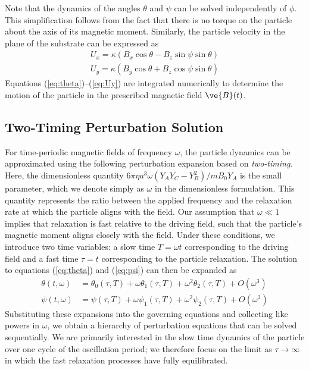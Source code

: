 Note that the dynamics of the angles $\theta$ and $\psi$ can be solved independently of $\phi$.  This simplification follows from the fact that there is no torque on the particle about the axis of its magnetic moment. Similarly, the particle velocity in the plane of the substrate can be expressed as
\begin{align}
    U_x = \kappa (B_x \cos \theta -  B_z \sin \psi \sin\theta) \label{eq:Ux}
    \\
    U_y = \kappa (B_y \cos\theta + B_z \cos\psi \sin\theta ) \label{eq:Uy}
\end{align}
Equations (\ref{eq:theta})--(\ref{eq:Uy}) are integrated numerically to determine the motion of the particle in the prescribed magnetic field $\ve{B}(t)$.

\subsection{Two-Timing Perturbation Solution}

For time-periodic magnetic fields of frequency $\omega$, the particle dynamics can be approximated using the following perturbation expansion based on \emph{two-timing}.\autocite{Strogatz2015} Here, the dimensionless quantity $6\pi \eta a^3 \omega (Y_A Y_C - Y_B^2)/m B_0 Y_A$ is the small parameter, which we denote simply as $\omega$ in the dimensionless formulation. This quantity represents the ratio between the applied frequency and the relaxation rate at which the particle aligns with the field.  Our assumption that $\omega\ll 1$ implies that relaxation is fast relative to the driving field, such that the particle's magnetic moment aligns closely with the field. Under these conditions, we introduce two time variables: a slow time $T=\omega t$ corresponding to the driving field and a fast time $\tau=t$ corresponding to the particle relaxation.  The solution to equations (\ref{eq:theta}) and (\ref{eq:psi}) can then be expanded as
\begin{align}
    \theta(t,\omega) &= \theta_0(\tau,T) + \omega \theta_1(\tau,T) + \omega^2 \theta_2(\tau,T) + O(\omega^3) \label{eq:thetaPower}
    \\
    \psi(t,\omega) &= \psi(\tau,T) + \omega \psi_1(\tau,T) + \omega^2 \psi_2(\tau,T) + O(\omega^3) \label{eq:psiPower}
\end{align}
Substituting these expansions into the governing equations and collecting like powers in $\omega$, we obtain a hierarchy of perturbation equations that can be solved sequentially. We are primarily interested in the slow time dynamics of the particle over one cycle of the oscillation period; we therefore focus on the limit as $\tau\rightarrow\infty$ in which the fast relaxation processes have fully equilibrated.

